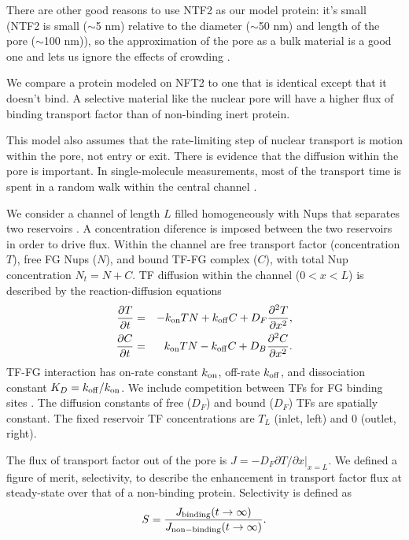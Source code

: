 There are other good reasons to use NTF2 as our model protein: it's small (NTF2 is small ($\sim$5 nm) relative
to the diameter ($\sim$50 nm) and length of the pore ($\sim$100 nm)), so the approximation of the pore as a bulk material is a good one and lets us ignore the effects of crowding \cite{zilman07}.

We compare a protein modeled on NFT2 to one that is identical except that it doesn't bind.  A selective material like the nuclear pore will have a higher flux of binding transport factor than of non-binding inert protein.

This model also assumes that the rate-limiting step of nuclear transport is motion within the pore, not entry or exit.  There is evidence that the diffusion within the pore is important. In single-molecule measurements, most of the transport time is spent in a random walk within the central channel \cite{yang04, tu13}.

We consider a channel of length $L$ filled homogeneously with Nups
that separates two reservoirs .  A concentration diference is imposed between the two reservoirs in order to drive flux.  Within the
channel are free transport factor (concentration $T$), free FG Nups
($N$), and bound TF-FG complex ($C$), with total Nup concentration
$N_t= N+C$.  TF diffusion within the channel ($0<x<L$) is described by
the reaction-diffusion equations
\begin{eqnarray}
  \frac{\partial T}{\partial t} &=& -k_{\rm on} T N+k_{\rm off} C +D_F
       \frac{\partial^2 T}{\partial x^2},\label{eq:continuum_main} 
   \\ 
  \frac{\partial C}{\partial t} &=& k_{\rm on} T N -k_{\rm off} C + 
        D_B \frac{\partial^2 C}{\partial x^2} .
\label{eq:continuum_main_2} 
\end{eqnarray}
TF-FG interaction has on-rate constant $k_{\rm on}$, off-rate $k_{\rm off}$, and
dissociation constant $K_D =k_{\rm off}/k_{\rm on}$.  We include competition
between TFs for FG binding sites \cite{timney16}.  The
diffusion constants of free ($D_F$) and bound ($D_F$) TFs are
spatially constant. The fixed reservoir TF concentrations are $T_L$
(inlet, left) and 0 (outlet, right).

The flux of transport factor out of the pore is
$J = - D_F \left. \partial T/\partial x \right|_{x=L}$.
We defined a figure of merit, selectivity, to describe the enhancement in transport factor flux at steady-state over that of a non-binding protein.  Selectivity is defined as
\begin{equation}
  S =  \frac{J_{\rm binding}(t \to \infty)}{J_{\rm non-binding}(t \to \infty)} .
\end{equation}

